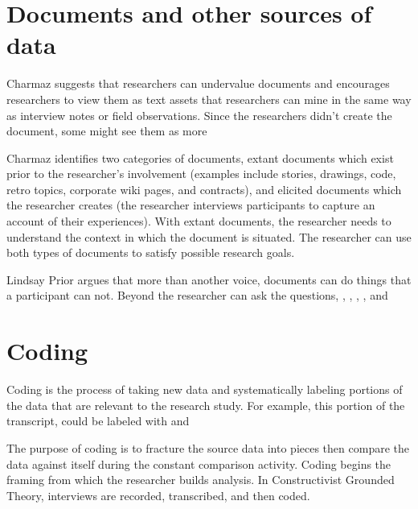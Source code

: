 \section{Documents and other sources of data}
Charmaz suggests that researchers can undervalue documents and encourages researchers to view them as text assets that researchers can mine in the same way as interview notes or field observations. Since the researchers didn't create the document, some might see them  as more  

Charmaz identifies two categories of documents, extant documents which exist prior to the researcher's involvement (examples include stories, drawings, code, retro topics, corporate wiki pages, and contracts), and elicited documents which the researcher creates (the researcher interviews participants to capture an account of their experiences). With extant documents, the researcher needs to understand the context in which the document is situated. The researcher can use both types of documents to satisfy possible research goals. 

Lindsay Prior \cite{Prior2003UsingDocuments} argues that more than another voice, documents can do things that a participant can not. Beyond  the researcher can ask the questions, , , , ,  and  
\section{Coding}
Coding is the process of taking new data and systematically labeling portions of the data that are relevant to the research study. For example, this portion of the transcript,  could be labeled with   and  

The purpose of coding is to fracture the source data into pieces then compare the data against itself during the constant comparison activity. Coding begins the framing from which the researcher builds analysis. In Constructivist Grounded Theory, interviews are recorded, transcribed, and then coded.


